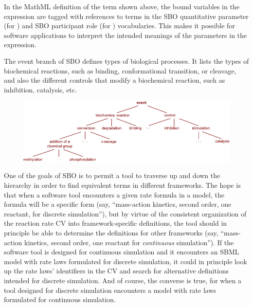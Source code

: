 In the MathML definition of the term shown above, the bound
variables in the  expression are tagged with
references to terms in the SBO quantitative parameter (for
) and SBO participant role (for ) vocabularies.
This makes it possible for software applications to interpret the
intended meanings of the parameters in the expression.

\begin{blockChanged}

The event branch of SBO defines types of biological processes.  It
lists the types of biochemical reactions, such as binding,
conformational transition, or cleavage, and also the different
controls that modify a biochemical reaction, such as inhibition,
catalysis, etc.

\begin{figure}[tbh]
  \centering
  \includegraphics[scale = 0.97]{figs/sbo-event}
  \caption{}
  \label{fig:sbo-event}
\end{figure}

\end{blockChanged}

One of the goals of SBO is to permit a tool to traverse up and
down the hierarchy in order to find equivalent terms in different
frameworks.  The hope is that when a software tool encounters a
given rate formula in a model, the formula will be a specific form
(say, ``mass-action kinetics, second order, one reactant, for
discrete simulation''), but by virtue of the consistent
organization of the reaction rate CV into framework-specific
definitions, the tool should in principle be able to determine the
definitions for other frameworks (say, ``mass-action kinetics,
second order, one reactant for \emph{continuous} simulation'').
If the software tool is designed for continuous simulation and it
encounters an SBML model with rate laws formulated for discrete
simulation, it could in principle look up the rate laws'
identifiers in the CV and search for alternative definitions
intended for discrete simulation.  And of course, the converse is
true, for when a tool designed for discrete simulation encounters
a model with rate laws formulated for continuous simulation.

